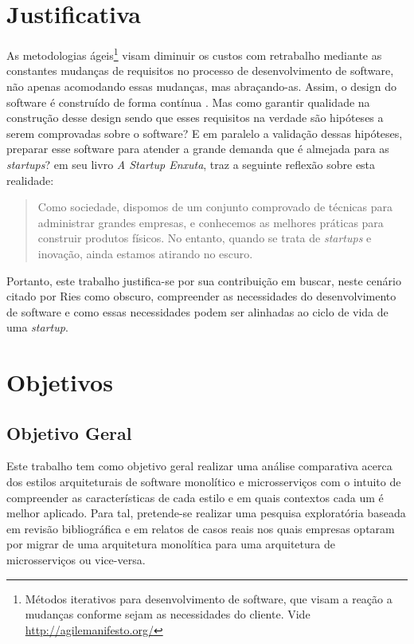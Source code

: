 \section{Justificativa}

As metodologias ágeis\footnote{Métodos iterativos para desenvolvimento de software,
que visam a reação a mudanças conforme sejam as necessidades do cliente. Vide
\url{http://agilemanifesto.org/}} visam diminuir os custos com retrabalho mediante as
constantes mudanças de requisitos no processo de desenvolvimento de software,
não apenas acomodando essas mudanças, mas abraçando-as. Assim, o design do
software é construído de forma contínua \cite{AgileSoftwareInnovation}.
Mas como garantir qualidade na construção desse design sendo que esses requisitos
na verdade são hipóteses a serem comprovadas sobre o software? E em paralelo
a validação dessas hipóteses, preparar esse software para atender a grande
demanda que é almejada para as \textit{startups}? 
em seu livro \textit{A Startup Enxuta}, traz a seguinte reflexão sobre esta
realidade:

  \begin{quotation}{}{}
    Como sociedade, dispomos de um conjunto comprovado de técnicas para
    administrar grandes empresas, e conhecemos as melhores práticas para
    construir produtos físicos. No entanto, quando se trata de \textit{startups}
    e inovação, ainda estamos atirando no escuro.
  \end{quotation}

Portanto, este trabalho justifica-se por sua contribuição em buscar, neste
cenário citado por Ries como obscuro, compreender as necessidades do desenvolvimento
de software e como essas necessidades podem ser alinhadas ao ciclo de vida de uma \textit{startup}.

\section{Objetivos}

\subsection{Objetivo Geral}
\label{sec:ObjetivoGeral}

Este trabalho tem como objetivo geral realizar uma análise comparativa acerca dos estilos
arquiteturais de software monolítico e microsserviços com o intuito de compreender as
características de cada estilo e em quais contextos cada um é melhor aplicado. Para tal, pretende-se
realizar uma pesquisa exploratória baseada em revisão bibliográfica e em relatos de casos reais nos
quais empresas optaram por migrar de uma arquitetura monolítica para uma arquitetura de
microsserviços ou vice-versa.

